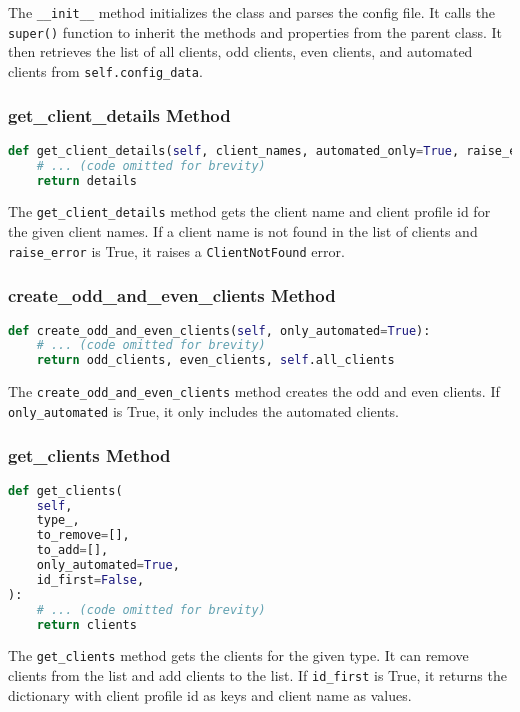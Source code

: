 The \verb|__init__| method initializes the class and parses the config file. It calls the \verb|super()| function to inherit the methods and properties from the parent class. It then retrieves the list of all clients, odd clients, even clients, and automated clients from \verb|self.config_data|.

\subsubsection{get\_client\_details Method}

\begin{lstlisting}[language=Python]
def get_client_details(self, client_names, automated_only=True, raise_error=True):
    # ... (code omitted for brevity)
    return details
\end{lstlisting}

The \verb|get_client_details| method gets the client name and client profile id for the given client names. If a client name is not found in the list of clients and \verb|raise_error| is True, it raises a \verb|ClientNotFound| error.

\subsubsection{create\_odd\_and\_even\_clients Method}

\begin{lstlisting}[language=Python]
def create_odd_and_even_clients(self, only_automated=True):
    # ... (code omitted for brevity)
    return odd_clients, even_clients, self.all_clients
\end{lstlisting}

The \verb|create_odd_and_even_clients| method creates the odd and even clients. If \verb|only_automated| is True, it only includes the automated clients.

\subsubsection{get\_clients Method}

\begin{lstlisting}[language=Python]
def get_clients(
    self,
    type_,
    to_remove=[],
    to_add=[],
    only_automated=True,
    id_first=False,
):
    # ... (code omitted for brevity)
    return clients
\end{lstlisting}

The \verb|get_clients| method gets the clients for the given type. It can remove clients from the list and add clients to the list. If \verb|id_first| is True, it returns the dictionary with client profile id as keys and client name as values.


